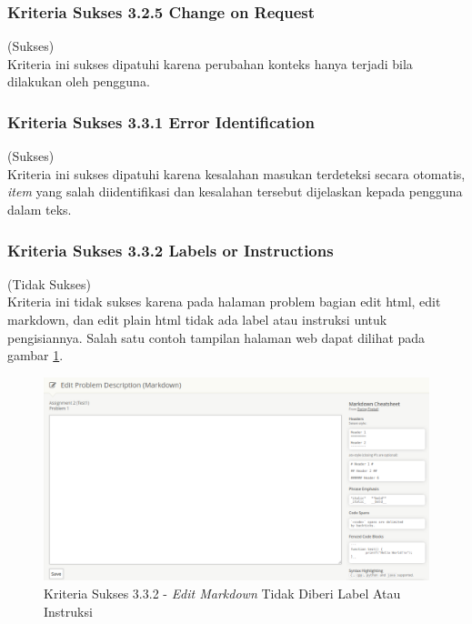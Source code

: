 \documentclass[a4paper,twoside]{article}
\begin{document}
\begin{enumerate}
\begin{itemize}
		\end{itemize}
		
		\subsubsection*{Kriteria Sukses 3.2.5 Change on Request}
		\label{subsubsec:kepatuhan_kriteria_3.2.5}
		(Sukses) \\
		
		Kriteria ini sukses dipatuhi karena perubahan konteks hanya terjadi bila dilakukan oleh pengguna.
		
		\subsubsection*{Kriteria Sukses 3.3.1 Error Identification}
		\label{subsubsec:kepatuhan_kriteria_3.3.1}
		(Sukses)\\
		
		Kriteria ini sukses dipatuhi karena kesalahan masukan terdeteksi secara otomatis, \textit{item} yang salah diidentifikasi dan kesalahan tersebut dijelaskan kepada pengguna dalam teks.
		
		\subsubsection*{Kriteria Sukses 3.3.2 Labels or Instructions}
		\label{subsubsec:kepatuhan_kriteria_3.3.2}
		(Tidak Sukses) \\
		
		Kriteria ini tidak sukses karena pada halaman problem bagian edit html, edit markdown, dan edit plain html tidak ada label atau instruksi untuk pengisiannya. Salah satu contoh tampilan halaman web dapat dilihat pada gambar \ref{fig:kepatuhan_3_3_2_edit_markdown}.
		\begin{figure}[H]
			\centering  
			\includegraphics[scale=0.25]{kepatuhan_3_3_2_edit_markdown}  
			\caption[Kriteria Sukses 3.3.2 - \textit{Edit Markdown} Tidak Diberi Label Atau Instruksi]{Kriteria Sukses 3.3.2 - \textit{Edit Markdown} Tidak Diberi Label Atau Instruksi} 
			\label{fig:kepatuhan_3_3_2_edit_markdown} 
		\end{figure}
		

\end{enumerate}
\end{document}
